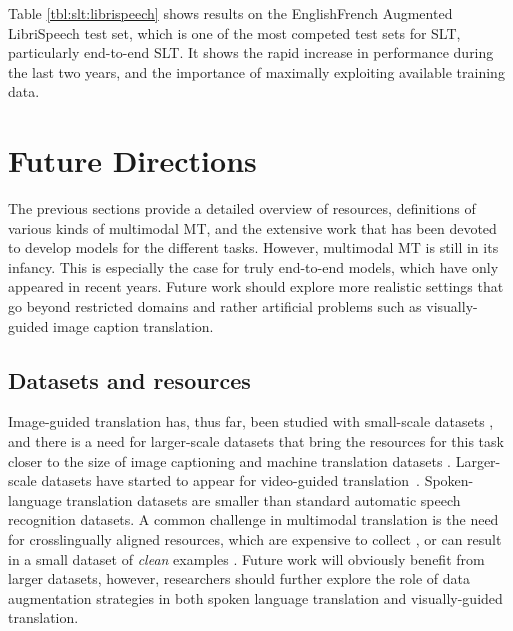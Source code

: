 \documentclass{svjour3}
\newcommand{\lp}[2]{#1#2}
\begin{document}
Table \ref{tbl:slt:librispeech} shows results on the \lp{English}{French} Augmented LibriSpeech test set, which is one of the most competed test sets for SLT, particularly end-to-end SLT. It shows the rapid increase in performance during the last two years, and the importance of maximally exploiting available training data.

     




\section{Future Directions}
\label{sec:future}
The previous sections provide a detailed overview of resources, definitions of various kinds of multimodal MT, and the extensive work that has been devoted to develop models for the different tasks. However, multimodal MT 
is still in its infancy. This is especially the case for truly end-to-end models, which have only appeared in recent years. Future work should explore more realistic settings that go beyond restricted domains and rather artificial problems such as visually-guided image caption translation.

\subsection{Datasets and resources}

Image-guided translation has, thus far, been studied with small-scale datasets \citep{elliott-multi30k:-2016}, and there is a need for larger-scale datasets that bring the resources for this task closer to the size of image captioning \citep{chen-microsoft-2015} and machine translation datasets \citep{tiedemann-parallel-2016}. Larger-scale datasets have started to appear for video-guided translation~\citep{sanabria-how2:-2018,wang-vatex-2019}. Spoken-language translation datasets \citep{kocabiyikoglu-librispeech-slt-2018, niehues-iwslt-2018} are smaller than standard automatic speech recognition datasets. A common challenge in multimodal translation is the need for crosslingually aligned resources, which are expensive to collect \citep{elliott-multi30k:-2016}, or can result in a small dataset of \textit{clean} examples \citep{kocabiyikoglu-librispeech-slt-2018}. Future work will obviously benefit from larger datasets, however, researchers should further explore the role of data augmentation strategies \citep{jia2019leveraging} in both spoken language translation and visually-guided translation.
\end{document}
